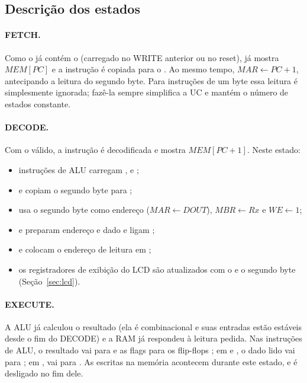 \subsection{Descrição dos estados}

\paragraph{FETCH.} Como o  já contém o  (carregado no WRITE
anterior ou no reset),  já mostra $MEM[PC]$ e a instrução é copiada
para o . Ao mesmo tempo, $MAR \gets PC + 1$, antecipando a leitura do
segundo byte. Para instruções de um byte essa leitura é simplesmente ignorada;
fazê-la sempre simplifica a UC e mantém o número de estados constante.

\paragraph{DECODE.} Com o  válido, a instrução é decodificada e
 mostra $MEM[PC+1]$. Neste estado:
\begin{itemize}[nosep]
  \item instruções de ALU carregam ,  e ;
  \item {} e  copiam o segundo byte para ;
  \item {} usa o segundo byte como endereço ($MAR \gets DOUT$),
        $MBR \gets Rx$ e $WE \gets 1$;
  \item {} e  preparam endereço e dado e ligam ;
  \item {} e  colocam o endereço de leitura em ;
  \item os registradores de exibição do LCD são atualizados com o  e o
        segundo byte (Seção~\ref{sec:lcd}).
\end{itemize}

\paragraph{EXECUTE.} A ALU já calculou o resultado (ela é combinacional e suas
entradas estão estáveis desde o fim do DECODE) e a RAM já respondeu à leitura
pedida. Nas instruções de ALU, o resultado vai para  e as flags para os
flip-flops ; em  e , o dado lido vai para
; em ,  vai para . As escritas na memória
acontecem durante este estado, e  é desligado no fim dele.

